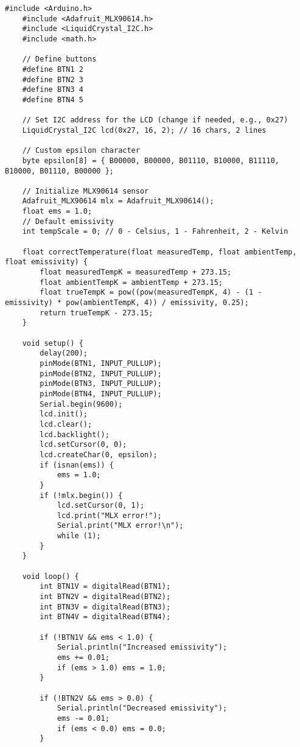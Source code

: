 \begin{lstlisting}[style=mystyle]
    #include <Arduino.h>
    #include <Adafruit_MLX90614.h>
    #include <LiquidCrystal_I2C.h>
    #include <math.h>
    
    // Define buttons
    #define BTN1 2
    #define BTN2 3
    #define BTN3 4
    #define BTN4 5
    
    // Set I2C address for the LCD (change if needed, e.g., 0x27)
    LiquidCrystal_I2C lcd(0x27, 16, 2); // 16 chars, 2 lines
    
    // Custom epsilon character
    byte epsilon[8] = { B00000, B00000, B01110, B10000, B11110, B10000, B01110, B00000 };
    
    // Initialize MLX90614 sensor
    Adafruit_MLX90614 mlx = Adafruit_MLX90614();
    float ems = 1.0;
    // Default emissivity
    int tempScale = 0; // 0 - Celsius, 1 - Fahrenheit, 2 - Kelvin
    
    float correctTemperature(float measuredTemp, float ambientTemp, float emissivity) {
        float measuredTempK = measuredTemp + 273.15;
        float ambientTempK = ambientTemp + 273.15;
        float trueTempK = pow((pow(measuredTempK, 4) - (1 - emissivity) * pow(ambientTempK, 4)) / emissivity, 0.25);
        return trueTempK - 273.15;
    }
    
    void setup() {
        delay(200);
        pinMode(BTN1, INPUT_PULLUP);
        pinMode(BTN2, INPUT_PULLUP);
        pinMode(BTN3, INPUT_PULLUP);
        pinMode(BTN4, INPUT_PULLUP);
        Serial.begin(9600);
        lcd.init();
        lcd.clear();
        lcd.backlight();
        lcd.setCursor(0, 0);
        lcd.createChar(0, epsilon);
        if (isnan(ems)) {
            ems = 1.0;
        }
        if (!mlx.begin()) {
            lcd.setCursor(0, 1);
            lcd.print("MLX error!");
            Serial.print("MLX error!\n");
            while (1);
        }
    }
    
    void loop() {
        int BTN1V = digitalRead(BTN1);
        int BTN2V = digitalRead(BTN2);
        int BTN3V = digitalRead(BTN3);
        int BTN4V = digitalRead(BTN4);
    
        if (!BTN1V && ems < 1.0) {
            Serial.println("Increased emissivity");
            ems += 0.01;
            if (ems > 1.0) ems = 1.0;
        }
    
        if (!BTN2V && ems > 0.0) {
            Serial.println("Decreased emissivity");
            ems -= 0.01;
            if (ems < 0.0) ems = 0.0;
        }
    

\end{lstlisting}
